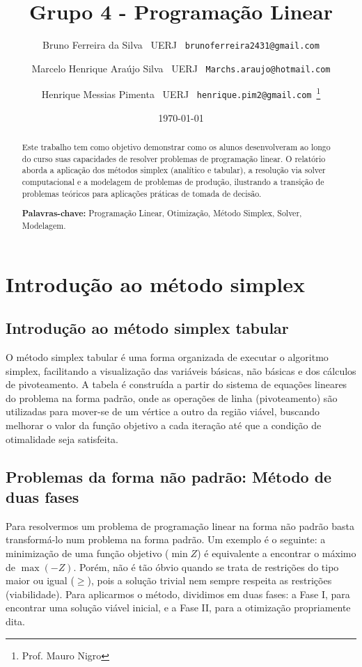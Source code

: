 \documentclass[12pt, a4paper]{article}
\title{Grupo 4 - Programação Linear}
\author{
  Bruno Ferreira da Silva \
  \small{UERJ} \
  \small{\texttt{brunoferreira2431@gmail.com}}
  \and
  Marcelo Henrique Araújo Silva \
  \small{UERJ} \
  \small{\texttt{Marchs.araujo@hotmail.com}}
  \and
  Henrique Messias Pimenta \
  \small{UERJ} \
  \small{\texttt{henrique.pim2@gmail.com}}\
  \thanks{Prof. Mauro Nigro}
}
\date{\today}
\begin{document}
\maketitle %
\cleardoublepage

\begin{abstract}
    \noindent
    Este trabalho tem como objetivo demonstrar como os alunos desenvolveram ao longo do curso suas capacidades de resolver problemas de programação linear. O relatório aborda a aplicação dos métodos simplex (analítico e tabular), a resolução via solver computacional e a modelagem de problemas de produção, ilustrando a transição de problemas teóricos para aplicações práticas de tomada de decisão.
    \vspace{\baselineskip} %
    
    \noindent
    \textbf{Palavras-chave:} Programação Linear, Otimização, Método Simplex, Solver, Modelagem.
\end{abstract}

\newpage
\tableofcontents %
\newpage


\section{Introdução ao método simplex}
\subsection{Introdução ao método simplex tabular}
O método simplex tabular é uma forma organizada de executar o algoritmo simplex, facilitando a visualização das variáveis básicas, não básicas e dos cálculos de pivoteamento. A tabela é construída a partir do sistema de equações lineares do problema na forma padrão, onde as operações de linha (pivoteamento) são utilizadas para mover-se de um vértice a outro da região viável, buscando melhorar o valor da função objetivo a cada iteração até que a condição de otimalidade seja satisfeita.

\subsection[Método de duas fases]{Problemas da forma não padrão: Método de duas fases}
Para resolvermos um problema de programação linear na forma não padrão basta transformá-lo num problema na forma padrão. Um exemplo é o seguinte: a minimização de uma função objetivo ($\min Z$) é equivalente a encontrar o máximo de $\max (-Z)$. Porém, não é tão óbvio quando se trata de restrições do tipo maior ou igual ($\ge$), pois a solução trivial nem sempre respeita as restrições (viabilidade). Para aplicarmos o método, dividimos em duas fases: a Fase I, para encontrar uma solução viável inicial, e a Fase II, para a otimização propriamente dita.
\end{document}
